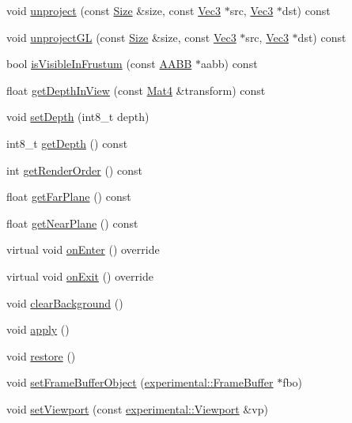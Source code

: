 \begin{DoxyCompactItemize}
void \hyperlink{classCamera_a48a0dab2e51ef11a166e650224e23419}{unproject} (const \hyperlink{classSize}{Size} \&size, const \hyperlink{classVec3}{Vec3} $\ast$src, \hyperlink{classVec3}{Vec3} $\ast$dst) const
\item 
void \hyperlink{classCamera_a2cdbc6f2403ea1f7213e5af66e31f37c}{unproject\+GL} (const \hyperlink{classSize}{Size} \&size, const \hyperlink{classVec3}{Vec3} $\ast$src, \hyperlink{classVec3}{Vec3} $\ast$dst) const
\item 
bool \hyperlink{classCamera_ad962c084c9de231d820b981f4b5846c9}{is\+Visible\+In\+Frustum} (const \hyperlink{classAABB}{A\+A\+BB} $\ast$aabb) const
\item 
float \hyperlink{classCamera_a5b38e0d536fb4773aaad12285634b227}{get\+Depth\+In\+View} (const \hyperlink{classMat4}{Mat4} \&transform) const
\item 
void \hyperlink{classCamera_a361809c317aebb2785ffbda7836e25ff}{set\+Depth} (int8\+\_\+t depth)
\item 
int8\+\_\+t \hyperlink{classCamera_afeacc2e59eb6cc6e32d55673f0c92ada}{get\+Depth} () const
\item 
int \hyperlink{classCamera_a126d10fabc05a9debd3c134f75dc0c14}{get\+Render\+Order} () const
\item 
float \hyperlink{classCamera_ae3582b9b0a37d8d3351f6a1fc5a9b45c}{get\+Far\+Plane} () const
\item 
float \hyperlink{classCamera_a06c0abe6144c4b19aa68935134d15c5c}{get\+Near\+Plane} () const
\item 
virtual void \hyperlink{classCamera_af22f3064a50c98832f448d7167a1f3cd}{on\+Enter} () override
\item 
virtual void \hyperlink{classCamera_aff2efb18d2837f4c443666ae94993185}{on\+Exit} () override
\item 
void \hyperlink{classCamera_ab343c58b5c9ad180b3b11bb42a32920c}{clear\+Background} ()
\item 
void \hyperlink{classCamera_a767aa79833180926e267f9ec82c44577}{apply} ()
\item 
void \hyperlink{classCamera_a5e2265707fe1a6e67e06a2f7d2893b74}{restore} ()
\item 
void \hyperlink{classCamera_a17b4f5537c83a29f8a7d809859e690a4}{set\+Frame\+Buffer\+Object} (\hyperlink{classexperimental_1_1FrameBuffer}{experimental\+::\+Frame\+Buffer} $\ast$fbo)
\item 
void \hyperlink{classCamera_a3070783685089524b0fc5b38d9623b9e}{set\+Viewport} (const \hyperlink{structexperimental_1_1Viewport}{experimental\+::\+Viewport} \&vp)

\end{DoxyCompactItemize}
